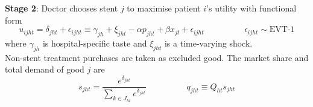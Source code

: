 \documentclass[11pt]{article}
\numberwithin{equation}{section}
\begin{document}
\textbf{Stage 2}: Doctor chooses stent $j$ to maximise patient $i$'s utility with functional form
\begin{equation}
\label{u}
	u_{ijht} = \delta_{jht} + \epsilon_{ijht} \equiv \gamma_{jh} + \xi_{jht} - \alpha p_{jht} + \beta x_{jt} + \epsilon_{ijht} \hspace{2cm} \epsilon_{ijht} \sim \text{EVT-1}
\end{equation}
where $\gamma_{jh}$ is hospital-specific taste and $\xi_{jht}$ is a time-varying shock. \\
Non-stent treatment purchases are taken as excluded good. The market share and total demand of good $j$ are
\begin{equation}
\label{share}
	s_{jht} = \frac{e^{\delta_{jht}}}{\sum_{k \in J_{ht}} e^{\delta_{jht}}} \hspace{2cm} q_{jht} \equiv Q_{ht}s_{jht}
\end{equation}
\end{document}
